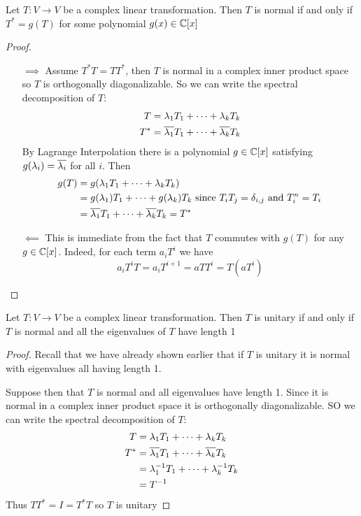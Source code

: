 \begin{theorem}
  Let $T : V \to V$ be a complex linear transformation. Then $T$ is normal
  if and only if $T^* = g(T)$ for some polynomial $g(x) \in \mathbb{C}[x]$
\end{theorem}
\begin{proof}
  \begin{itemize}
    \item[$\implies$] Assume $T^*T = TT^*$, then $T$ is normal in a complex inner product space
      so $T$ is orthogonally diagonalizable. So we can write the spectral decomposition of $T$:
        \begin{align}
          T &= \lambda_1T_1 + \cdots + \lambda_kT_k \\
          T^* &= \overline{\lambda_1}T_1 + \cdots + \overline{\lambda_k}T_k
        \end{align}
      By Lagrange Interpolation there is a polynomial $g \in \mathbb{C}[x]$ satisfying $g(\lambda_i) = \overline{\lambda_i}$ for all $i$. Then
        \begin{align}
          g(T) &= g(\lambda_1T_1 + \cdots + \lambda_kT_k) \\
               &= g(\lambda_1)T_1 + \cdots + g(\lambda_k)T_k \text{ since } T_iT_j = \delta_{i,j} \text{ and } T_i^n = T_i \\
               &= \overline{\lambda_1} T_1 + \cdots + \overline{\lambda_k} T_k = T^*
        \end{align}
    \item[$\impliedby$] This is immediate from the fact that $T$ commutes with $g(T)$ for any $g \in \mathbb{C}[x]$.
      Indeed, for each term $a_iT^i$ we have
        $$a_iT^iT = a_iT^{i+1} = aTT^{i} = T(aT^i)$$
  \end{itemize}
\end{proof}

\begin{theorem}
  Let $T : V \to V$ be a complex linear transformation. Then $T$ is unitary if and only if
  $T$ is normal and all the eigenvalues of $T$ have length 1
\end{theorem}
\begin{proof}
  Recall that we have already shown earlier that if $T$ is unitary it is normal with eigenvalues all having length 1.

  Suppose then that $T$ is normal and all eigenvalues have length 1. Since it is normal in a complex inner product space
  it is orthogonally diagonalizable. SO we can write the spectral decomposition of $T$:
    \begin{align}
      T &= \lambda_1 T_1 + \cdots + \lambda_kT_k \\
      T^* &= \overline{\lambda_1}T_1 + \cdots + \overline{\lambda_k}T_k \\
          &= \lambda_1^{-1}T_1 + \cdots + \lambda_k^{-1}T_k \\
          &= T^{-1}
    \end{align}
  Thus $TT^* = I = T^*T$ so $T$ is unitary
\end{proof}

